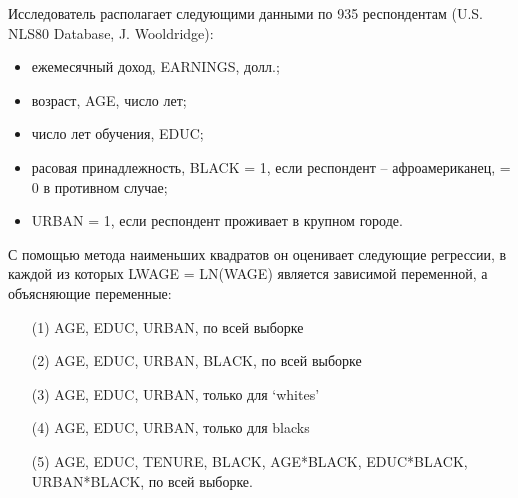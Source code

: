 \documentclass[addpoints, answers]{exam} %
\begin{document}
\begin{questions}
\question Исследователь располагает следующими данными по 935 респондентам (U.S. NLS80 Database, J. Wooldridge):\\
\begin{itemize}
\item ежемесячный доход, EARNINGS, долл.;
\item возраст, AGE, число лет;
\item число лет обучения, EDUC;
\item расовая принадлежность, BLACK = 1, если респондент – афроамериканец, = 0 в противном случае;
\item URBAN = 1, если респондент проживает в крупном городе.
\end{itemize}
С помощью метода наименьших квадратов он оценивает следующие регрессии, в каждой из которых LWAGE = LN(WAGE) является зависимой переменной, а объясняющие переменные:
\begin{enumerate}
\item[(1)] AGE, EDUC, URBAN, по всей выборке
\item[(2)] AGE, EDUC, URBAN, BLACK, по всей выборке
\item[(3)] AGE, EDUC, URBAN, только для ‘whites’
\item[(4)] AGE, EDUC, URBAN, только для blacks
\item[(5)] AGE, EDUC, TENURE, BLACK, AGE*BLACK, EDUC*BLACK, URBAN*BLACK, по всей выборке.
\end{enumerate}


\end{questions}
\end{document}
